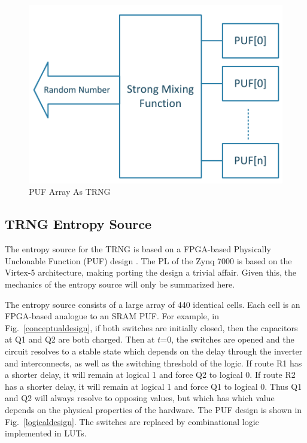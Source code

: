 \documentclass[journal]{IEEEtran}
\begin{document}
\begin{figure}[!th]
\centering
\includegraphics[scale=.75]{Images/trng.pdf}
\caption{PUF Array As TRNG }
\label{fig:trng}
\end{figure} 





\subsection{TRNG Entropy Source}

The entropy source for the TRNG is based on a FPGA-based Physically Unclonable Function (PUF) design \cite{fpga_puf}. The PL of the Zynq 7000 is based on the Virtex-5 architecture, making porting the design a trivial affair. Given this,  the mechanics of the entropy source will only be summarized here. 

The entropy source consists of a large array of 440 identical cells. Each cell is an FPGA-based analogue to an SRAM PUF. For example, in Fig.~\ref{conceptualdesign}, if both switches are initially closed, then the capacitors at Q1 and Q2 are both charged. Then at $t$=0, the switches are opened and the circuit resolves to a stable state which depends on the  delay through the inverter and interconnects, as well as the switching threshold of the logic. If route R1 has a shorter delay, it will remain at logical 1 and force Q2 to logical 0. If route R2 has a shorter delay, it will remain at logical 1 and force Q1 to logical 0. Thus Q1 and Q2 will always resolve to opposing values, but which has which value depends on the physical properties of the hardware.  The PUF design is shown in Fig.~\ref{logicaldesign}.  The switches are replaced by combinational logic implemented in LUTs.
\end{document}
